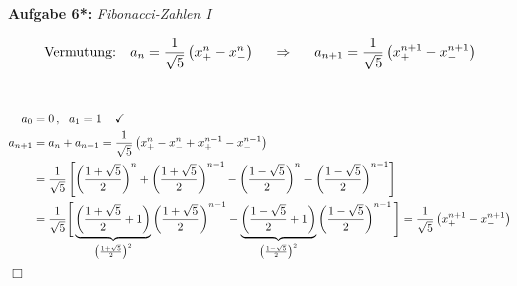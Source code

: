 %
\textbf{Aufgabe 6*: } \emph{Fibonacci-Zahlen I}\\
\begin{minipage}{0.6\linewidth}
\begin{align*}
\text{Vermutung: }\hspace{0.2cm} a_n=\frac{1}{\sqrt{5}}\left(x_+^n-x_-^n\right) \hspace{0.5cm} \Rightarrow \hspace{0.5cm} a_{n+1}=\frac{1}{\sqrt{5}}\left(x_+^{n+1}-x_-^{n+1}\right)
\end{align*}
\end{minipage}\\
\begin{align*}
a_0&=0\,,\ \ a_1=1\hspace{0.4cm}\checkmark\\
a_{n+1}&=a_n+a_{n-1}=\frac{1}{\sqrt{5}}\left(x_+^n-x_-^n+x_+^{n-1}-x_-^{n-1}\right)\\
&=\frac{1}{\sqrt{5}}\left[\left(\frac{1+\sqrt{5}}{2}\right)^n+\left(\frac{1+\sqrt{5}}{2}\right)^{n-1}-\left(\frac{1-\sqrt{5}}{2}\right)^n-\left(\frac{1-\sqrt{5}}{2}\right)^{n-1}\right]\\
&=\frac{1}{\sqrt{5}}\Bigg[\underbrace{\left(\frac{1+\sqrt{5}}{2}+1\right)}_{\left(\frac{1+\sqrt{5}}{2}\right)^2}\left(\frac{1+\sqrt{5}}{2}\right)^{n-1}-\underbrace{\left(\frac{1-\sqrt{5}}{2}+1\right)}_{\left(\frac{1-\sqrt{5}}{2}\right)^2}\left(\frac{1-\sqrt{5}}{2}\right)^{n-1}\Bigg]
=\frac{1}{\sqrt{5}}\left(x_+^{n+1}-x_-^{n+1}\right)
\end{align*}\hfill $\Box$\\[0.7cm]
%
%
